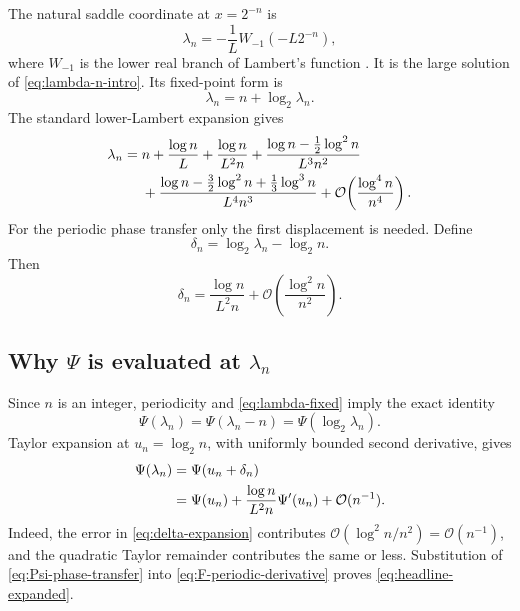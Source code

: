 \documentclass[11pt,oneside]{article}
\theoremstyle{definition}
\theoremstyle{remark}
\newcommand{\bigO}{\mathcal O}
\begin{document}
The natural saddle coordinate at $x=2^{-n}$ is
\begin{equation}
 \lambda_n=-\frac1L W_{-1}(-L2^{-n}),                       \label{eq:lambda-W}
\end{equation}
where $W_{-1}$ is the lower real branch of Lambert's function
\cite{corless1996}.  It is the large solution of \eqref{eq:lambda-n-intro}.  Its fixed-point
form is
\begin{equation}
 \lambda_n=n+\log_2\lambda_n.                               \label{eq:lambda-fixed}
\end{equation}
The standard lower-Lambert expansion gives
\begin{align}
 \lambda_n={}&n+\frac{\log n}{L}+\frac{\log n}{L^2n}
 +\frac{\log n-\tfrac12\log^2n}{L^3n^2}                    \notag\\
 &+\frac{\log n-\tfrac32\log^2n+\tfrac13\log^3n}{L^4n^3}
 +\bigO\!\left(\frac{\log^4n}{n^4}\right).               \label{eq:lambda-expansion}
\end{align}
For the periodic phase transfer only the first displacement is needed.  Define
\begin{equation}
 \delta_n=\log_2\lambda_n-\log_2n.                          \label{eq:delta}
\end{equation}
Then
\begin{equation}
 \delta_n=\frac{\log n}{L^2n}
 +\bigO\!\left(\frac{\log^2n}{n^2}\right).                \label{eq:delta-expansion}
\end{equation}

\subsection{Why \texorpdfstring{$\Psi$}{Psi} is evaluated at \texorpdfstring{$\lambda_n$}{lambda n}}

Since $n$ is an integer, periodicity and \eqref{eq:lambda-fixed} imply the exact identity
\begin{equation}
 \Psi(\lambda_n)=\Psi(\lambda_n-n)
 =\Psi(\log_2\lambda_n).                                   \label{eq:Psi-lambda-exact}
\end{equation}
Taylor expansion at $u_n=\log_2n$, with uniformly bounded second derivative, gives
\begin{align}
 \Psi(\lambda_n)
 &=\Psi(u_n+\delta_n)                                      \notag\\
 &=\Psi(u_n)+\frac{\log n}{L^2n}\Psi'(u_n)
   +\bigO(n^{-1}).                                          \label{eq:Psi-phase-transfer}
\end{align}
Indeed, the error in \eqref{eq:delta-expansion} contributes
$\bigO(\log^2n/n^2)=\bigO(n^{-1})$, and the quadratic Taylor remainder contributes the same
or less.  Substitution of \eqref{eq:Psi-phase-transfer} into
\eqref{eq:F-periodic-derivative} proves \eqref{eq:headline-expanded}.
\end{document}
